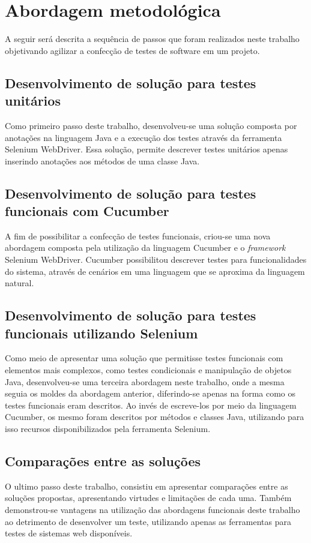 \documentclass[tg]{mdtufsm}
\begin{document}
\section{Abordagem metodológica}
A seguir será descrita a sequência de passos que foram realizados neste trabalho
objetivando agilizar a confecção de testes de software em um projeto.

\subsection{Desenvolvimento de solução para testes unitários}
Como primeiro passo deste trabalho, desenvolveu-se uma solução composta por anotações na linguagem Java e a execução dos testes através da ferramenta Selenium WebDriver.
Essa solução, permite descrever testes unitários apenas inserindo anotações aos métodos de uma classe Java.

\subsection{Desenvolvimento de solução para testes funcionais com Cucumber}
A fim de possibilitar a confecção de testes funcionais, criou-se uma nova abordagem composta pela utilização da linguagem Cucumber e o \emph{framework} Selenium WebDriver.
Cucumber possibilitou descrever testes para funcionalidades do sistema, através de cenários em uma linguagem que se aproxima da linguagem natural.

\subsection{Desenvolvimento de solução para testes funcionais utilizando Selenium}
Como meio de apresentar uma solução que permitisse testes funcionais com elementos mais complexos, como testes condicionais e manipulação de objetos Java, desenvolveu-se
uma terceira abordagem neste trabalho, onde a mesma seguia os moldes da abordagem anterior, diferindo-se apenas na forma como os testes funcionais eram descritos. Ao invés de
escreve-los por meio da linguagem Cucumber, os mesmo foram descritos por métodos e classes Java, utilizando para isso recursos disponibilizados pela ferramenta Selenium.

\subsection{Comparações entre as soluções}
O ultimo passo deste trabalho, consistiu em apresentar comparações entre as soluções propostas, apresentando virtudes e limitações de cada uma. Também demonstrou-se
vantagens na utilização das abordagens funcionais deste trabalho ao detrimento de desenvolver um teste, utilizando apenas as ferramentas para testes de sistemas web disponíveis.
\end{document}
